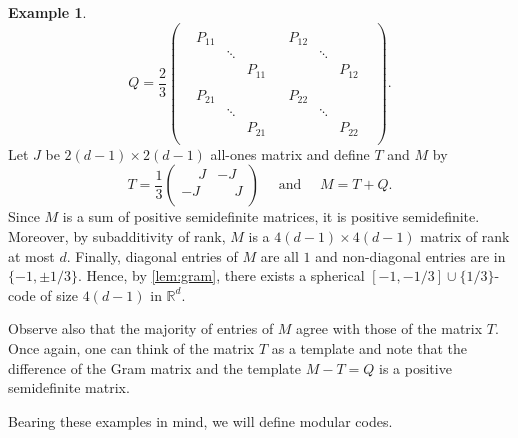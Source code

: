 \documentclass[reqno, 11pt]{amsart}
\theoremstyle{definition}
\newtheorem{example}[theorem]{Example}
\theoremstyle{remark}
\newcommand{\RR}{\mathbb{R}}
\begin{document}
\begin{example}
\[
	Q = \frac{2}{3}\begin{pmatrix}
	\begin{array}{c|c}
		\begin{array}{ccc}
			P_{11} &  &    \\
			 &  \ddots &  \\
			 &   & P_{11}
		\end{array}
		&
		\begin{array}{ccc}
			P_{12} &   &  \\
			 &   \ddots &  \\
			 &    & P_{12}
		\end{array}
		\\
		\hline
		\begin{array}{ccc}
			P_{21} &    &  \\
			 &   \ddots &  \\
			 &   & P_{21}
		\end{array}
		&
		\begin{array}{ccc}
			P_{22} &  &    \\
			 &   \ddots &  \\
			 &    & P_{22}
		\end{array}
	\end{array}
\end{pmatrix}.
\]
Let  $J$ be $2(d-1)\times 2(d-1)$ all-ones matrix and define $T$ and $M$ by 
\[
	T = \frac{1}{3}\begin{pmatrix}
		\phantom{+}J & -J \\
		-J & \phantom{+}J \\
	\end{pmatrix} \quad \text{ and } \quad M = T + Q.
\]
Since $M$ is a sum of positive semidefinite matrices, it is positive semidefinite. Moreover, by subadditivity of rank, $M$ is a $4(d-1) \times 4(d-1)$ matrix of rank at most $d$. Finally, diagonal entries of $M$ are all $1$ and non-diagonal entries are in $\{-1, \pm 1/3\}$. Hence, by \cref{lem:gram}, there exists a spherical $[-1, -1/3]\cup \{1/3\}$-code of size $4(d-1)$ in $\RR^d$.

Observe also that the majority of entries of $M$ agree with those of the matrix $T$. Once again, one can think of the matrix $T$ as a template and note that the difference of the Gram matrix and the template $M -T = Q$ is a positive semidefinite matrix.
\end{example}

  Bearing these examples in mind, we will define modular codes.
\end{document}
